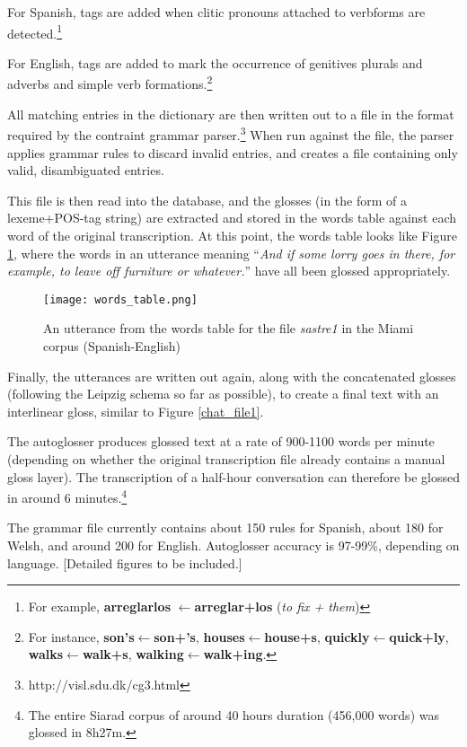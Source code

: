 \documentclass[11pt]{article}
\begin{document}
For Spanish, tags are added when clitic pronouns attached to verbforms are detected.\footnote{For example, \textbf{arreglarlos} $\leftarrow$\textbf{arreglar+los} (\textit{to fix + them})}  

For English, tags are added to mark the occurrence of genitives plurals and adverbs and simple verb formations.\footnote{For instance, \textbf{son's$\leftarrow$son+'s}, \textbf{houses$\leftarrow$house+s}, \textbf{quickly$\leftarrow$quick+ly}, \textbf{walks$\leftarrow$walk+s}, \textbf{walking$\leftarrow$walk+ing}.}

All matching entries in the dictionary are then written out to a file in the format required by the contraint grammar parser.\footnote{http://visl.sdu.dk/cg3.html}  When run against the file, the parser applies grammar rules to discard invalid entries, and creates a file containing only valid, disambiguated entries.

This file is then read into the database, and the glosses (in the form of a lexeme+POS-tag string) are extracted and stored in the words table against each word of the original transcription.  At this point, the words table looks like Figure \ref{words_db}, where the words in an utterance meaning ``\textit{And if some lorry goes in there, for example, to leave off furniture or whatever.}'' have all been glossed appropriately.

\begin{figure}[!hbtp]
\centering
\texttt{[image: words\_table.png]}
\caption{An utterance from the words table for the file \textit{sastre1} in the Miami corpus (Spanish-English)}
\label{words_db}
\end{figure}

Finally, the utterances are written out again, along with the concatenated glosses (following the Leipzig schema \cite{leipzig2008} so far as possible), to create a final text with an interlinear gloss, similar to Figure \ref{chat_file1}.

The autoglosser produces glossed text at a rate of 900-1100 words per minute (depending on whether the original transcription file already contains a manual gloss layer).  The transcription of a half-hour conversation can therefore be glossed in around 6 minutes.\footnote{The entire Siarad corpus of around 40 hours duration (456,000 words) was glossed in 8h27m.} 

The grammar file currently contains about 150 rules for Spanish, about 180 for Welsh, and around 200 for English.  Autoglosser accuracy is 97-99\%, depending on language. [Detailed figures to be included.]
\end{document}

